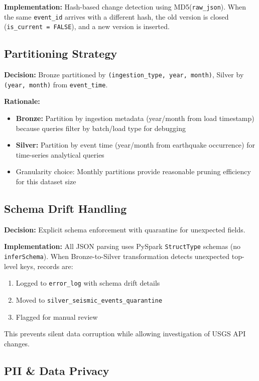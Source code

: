 \documentclass[11pt,a4paper]{article}
\begin{document}
\noindent\textbf{Implementation:} Hash-based change detection using MD5(\texttt{raw\_json}). When the same \texttt{event\_id} arrives with a different hash, the old version is closed (\texttt{is\_current = FALSE}), and a new version is inserted.

\subsection{Partitioning Strategy}

\noindent\textbf{Decision:} Bronze partitioned by \texttt{(ingestion\_type, year, month)}, Silver by \texttt{(year, month)} from \texttt{event\_time}.

\noindent\textbf{Rationale:}
\begin{itemize}[nosep]
    \item \textbf{Bronze:} Partition by ingestion metadata (year/month from load timestamp) because queries filter by batch/load type for debugging
    \item \textbf{Silver:} Partition by event time (year/month from earthquake occurrence) for time-series analytical queries
    \item Granularity choice: Monthly partitions provide reasonable pruning efficiency for this dataset size
\end{itemize}

\subsection{Schema Drift Handling}

\noindent\textbf{Decision:} Explicit schema enforcement with quarantine for unexpected fields.

\noindent\textbf{Implementation:} All JSON parsing uses PySpark \texttt{StructType} schemas (no \texttt{inferSchema}). When Bronze-to-Silver transformation detects unexpected top-level keys, records are:
\begin{enumerate}[nosep]
    \item Logged to \texttt{error\_log} with schema drift details
    \item Moved to \texttt{silver\_seismic\_events\_quarantine}
    \item Flagged for manual review
\end{enumerate}

\noindent This prevents silent data corruption while allowing investigation of USGS API changes.

\subsection{PII \& Data Privacy}
\end{document}
